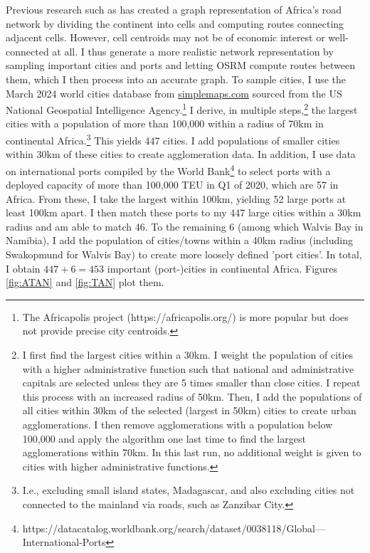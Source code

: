 \documentclass[a4paper]{article}
\begin{document}
Previous research such as \citet{graff2019spatial} has created a graph representation of Africa's road network by dividing the continent into cells and computing routes connecting adjacent cells. However, cell centroids may not be of economic interest or well-connected at all. I thus generate a more realistic network representation by sampling important cities and ports and letting OSRM compute routes between them, which I then process into an accurate graph. To sample cities, I use the March 2024 world cities database from \href{https://simplemaps.com/data/world-cities}{simplemaps.com} sourced from the US National Geospatial Intelligence Agency.\footnote{The Africapolis project (https://africapolis.org/) is more popular but does not provide precise city centroids.} I derive, in multiple steps,\footnote{I first find the largest cities within a 30km. I weight the population of cities with a higher administrative function such that national and administrative capitals are selected unless they are 5 times smaller than close cities. I repeat this process with an increased radius of 50km. Then, I add the populations of all cities within 30km of the selected (largest in 50km) cities to create urban agglomerations. I then remove agglomerations with a population below 100,000 and apply the algorithm one last time to find the largest agglomerations within 70km. In this last run, no additional weight is given to cities with higher administrative functions. } the largest cities with a population of more than 100,000 within a radius of 70km in continental Africa.\footnote{I.e., excluding small island states, Madagascar, and also excluding cities not connected to the mainland via roads, such as Zanzibar City.} This yields 447 cities. I add populations of smaller cities within 30km of these cities to create agglomeration data. In addition, I use data on international ports compiled by the World Bank\footnote{https://datacatalog.worldbank.org/search/dataset/0038118/Global---International-Ports} to select ports with a deployed capacity of more than 100,000 TEU in Q1 of 2020, which are 57 in Africa. From these, I take the largest within 100km, yielding 52 large ports at least 100km apart. I then match these ports to my 447 large cities within a 30km radius and am able to match 46. To the remaining 6 (among which Walvis Bay in Namibia), I add the population of cities/towns within a 40km radius (including Swakopmund for Walvis Bay) to create more loosely defined 'port cities'. In total, I obtain $447+6=453$ important (port-)cities in continental Africa. Figures \ref{fig:ATAN} and \ref{fig:TAN} plot them.  \newline 
\end{document}
